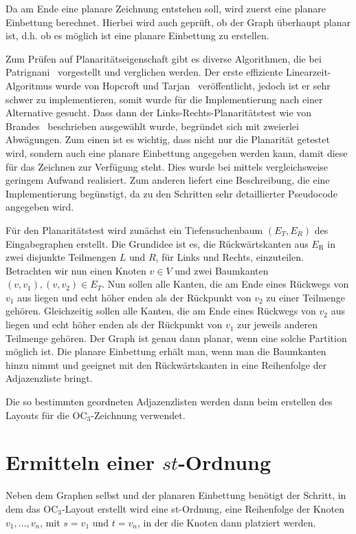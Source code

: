 \documentclass[a4paper]{scrreprt}
\theoremstyle{definition}
\begin{document}
Da am Ende eine planare Zeichnung entstehen soll, wird zuerst eine planare Einbettung berechnet. Hierbei wird auch geprüft, ob der Graph überhaupt planar ist, d.h. ob es möglich ist eine planare Einbettung zu erstellen. 

Zum Prüfen auf Planaritätseigenschaft gibt es diverse Algorithmen, die bei Patrignani~\cite{patrignani-07} vorgestellt und verglichen werden. Der erste effiziente Linearzeit-Algoritmus wurde von Hopcroft und Tarjan~\cite{hopcroft+tarjan-74} veröffentlicht, jedoch ist er sehr schwer zu implementieren, somit wurde für die Implementierung nach einer Alternative gesucht. Dass dann der Links-Rechts-Planaritätstest wie von Brandes~\cite{brandes-09} beschrieben ausgewählt wurde, begründet sich mit zweierlei Abwägungen. Zum einen ist es wichtig, dass nicht nur die Planarität getestet wird, sondern auch eine planare Einbettung angegeben werden kann, damit diese für das Zeichnen zur Verfügung steht. Dies wurde bei \cite{brandes-09} mittels vergleichsweise geringem Aufwand realisiert. Zum anderen liefert \cite{brandes-09} eine Beschreibung, die eine Implementierung begünstigt, da zu den Schritten sehr detaillierter Pseudocode angegeben wird. %

Für den Planaritätstest wird zunächst ein Tiefensuchenbaum $(E_T, E_R)$ des Eingabegraphen erstellt. Die Grundidee ist es, die Rückwärtskanten aus $E_\text{R}$ in zwei disjunkte Teilmengen $L$ und $R$, für Links und Rechts, einzuteilen. Betrachten wir nun einen Knoten $v \in V$ und zwei Baumkanten $(v, v_1), (v, v_2) \in E_T$. Nun sollen alle Kanten, die am Ende eines Rückwegs von $v_1$ aus liegen und echt höher enden als der Rückpunkt von $v_2$ zu einer Teilmenge gehören. Gleichzeitig sollen alle Kanten, die am Ende eines Rückwegs von $v_2$ aus liegen und echt höher enden als der Rückpunkt von $v_1$ zur jeweils anderen Teilmenge gehören. Der Graph ist genau dann planar, wenn eine solche Partition möglich ist. Die planare Einbettung erhält man, wenn man die Baumkanten hinzu nimmt und geeignet mit den Rückwärtskanten in eine Reihenfolge der Adjazenzliste bringt.

Die so bestimmten geordneten Adjazenzlisten werden dann beim erstellen des Layouts für die OC$_3$-Zeichnung verwendet.

\section{Ermitteln einer $st$-Ordnung}

Neben dem Graphen selbst und der planaren Einbettung benötigt der Schritt, in dem das OC$_3$-Layout erstellt wird eine st-Ordnung, eine Reihenfolge der Knoten $v_1, \dots, v_n$, mit $s=v_1$ und $t=v_n$, in der die Knoten dann platziert werden. 
\end{document}
